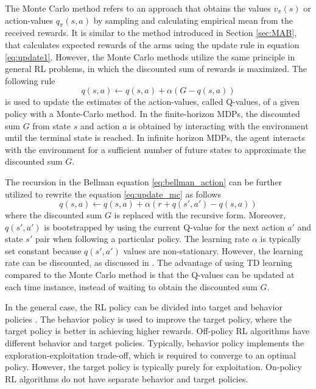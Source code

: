 \documentclass[english, 12pt, a4paper, elec, utf8, a-1b, online]{aaltothesis}
\numberwithin{equation}{section}
\begin{document}
The Monte Carlo method refers to an approach that obtains the values $v_\pi(s)$ or action-values $q_\pi(s, a)$ by sampling and calculating empirical mean from the received rewards. 
It is similar to the method introduced in Section \ref{sec:MAB}, that calculates expected rewards of the arms using the update rule in equation \eqref{eq:update1}. 
However, the Monte Carlo methods utilize the same principle in general RL problems, in which the discounted sum of rewards is maximized. 
The following rule \cite{Sutton2018}
\begin{equation}\label{eq:update_mc}
    q(s, a) \leftarrow q(s, a) + \alpha (G - q(s, a))
\end{equation}
is used to update the estimates of the action-values, called Q-values, of a given policy with a Monte-Carlo method. 
In the finite-horizon MDPs, the discounted sum $G$ from state $s$ and action $a$ is obtained by interacting with the environment until the terminal state is reached.   
In infinite horizon MDPs, the agent interacts with the environment for a sufficient number of future states to approximate the discounted sum $G$.

The recursion in the Bellman equation \eqref{eq:bellman_action} can be further utilized to rewrite the equation \eqref{eq:update_mc} as follows \cite{Sutton2018}
\begin{equation}\label{eq:update_td}
    q(s, a) \leftarrow q(s, a) + \alpha \left( r + q(s', a') - q(s, a) \right)
\end{equation}
where the discounted sum $G$ is replaced with the recursive form.
Moreover, $q(s', a')$ is bootstrapped by using the current Q-value for the next action $a'$ and state $s'$ pair when following a particular policy.
The learning rate $\alpha$ is typically set constant because $q(s', a')$ values are non-stationary.
However, the learning rate can be discounted, as discussed in \cite{Even-Dar2003}.
The advantage of using TD learning compared to the Monte Carlo method is that the Q-values can be updated at each time instance, instead of waiting to obtain the discounted sum $G$.

In the general case, the RL policy can be divided into target and behavior policies \cite{Sutton2018}.
The behavior policy is used to improve the target policy, where the target policy is better in achieving higher rewards.
Off-policy RL algorithms have different behavior and target policies.
Typically, behavior policy implements the exploration-exploitation trade-off, which is required to converge to an optimal policy. 
However, the target policy is typically purely for exploitation. 
On-policy RL algorithms do not have separate behavior and target policies. 
\end{document}
